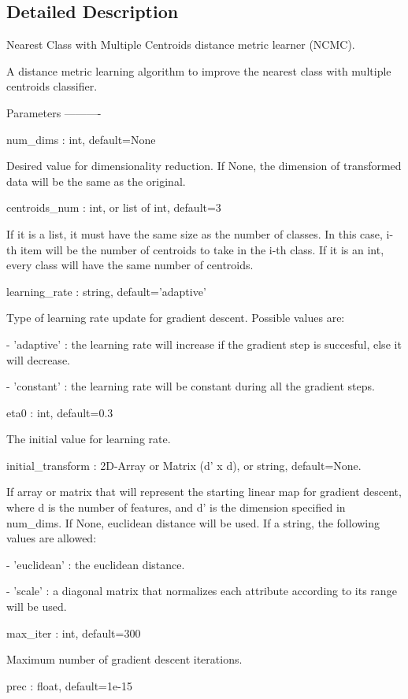 \subsection{Detailed Description}
\begin{DoxyVerb}Nearest Class with Multiple Centroids distance metric learner (NCMC).

A distance metric learning algorithm to improve the nearest class with multiple centroids classifier.

Parameters
----------

num_dims : int, default=None

    Desired value for dimensionality reduction. If None, the dimension of transformed data will be the same as the original.

centroids_num : int, or list of int, default=3

    If it is a list, it must have the same size as the number of classes. In this case, i-th item will be the number of
    centroids to take in the i-th class. If it is an int, every class will have the same number of centroids.

learning_rate : string, default='adaptive'

    Type of learning rate update for gradient descent. Possible values are:

    - 'adaptive' : the learning rate will increase if the gradient step is succesful, else it will decrease.

    - 'constant' : the learning rate will be constant during all the gradient steps.

eta0 : int, default=0.3

    The initial value for learning rate.

initial_transform : 2D-Array or Matrix (d' x d), or string, default=None.

    If array or matrix that will represent the starting linear map for gradient descent, where d is the number of features,
    and d' is the dimension specified in num_dims.
    If None, euclidean distance will be used. If a string, the following values are allowed:

    - 'euclidean' : the euclidean distance.

    - 'scale' : a diagonal matrix that normalizes each attribute according to its range will be used.

max_iter : int, default=300

    Maximum number of gradient descent iterations.

prec : float, default=1e-15


\end{DoxyVerb}
